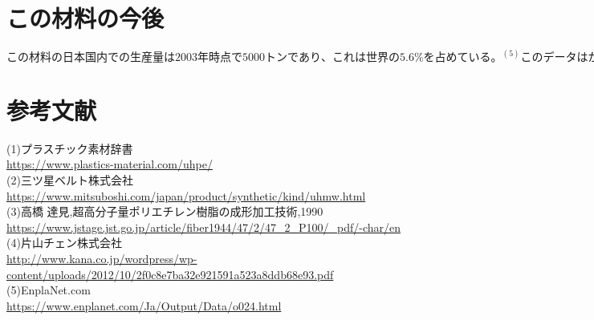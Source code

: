 \documentclass[dvipdfmx,autodetect-engine,titlepage]{jsarticle}
\begin{document}
\section{この材料の今後}
\begin{math}
  この材料の日本国内での生産量は2003年時点で5000トンであり、これは世界の5.6\%
を占めている。^{(5)}このデータはかなり古いものであるが、現在ではさらに使用量が増えていると考えて
良いだろう。なぜなら、CiNii Articlesで超高分子ポリエチレンを調べたところ、
最近に出版された論文がいくつか見つけることができたからである、つまりこれは、
現代でも研究開発が行われているということである。近年のこの材料の使用方法
としては、人体に無毒であることを利用して、人工関節、医療機器、によく使用
されていることがわかった。さらに、今後はロボット分野でも使用されていくと
考えられる。
\end{math}

\section{参考文献}

(1)プラスチック素材辞書\\
\url{https://www.plastics-material.com/uhpe/}\\

(2)三ツ星ベルト株式会社\\
\url{https://www.mitsuboshi.com/japan/product/synthetic/kind/uhmw.html}\\

(3)高橋 達見,超高分子量ポリエチレン樹脂の成形加工技術,1990\\
\url{https://www.jstage.jst.go.jp/article/fiber1944/47/2/47_2_P100/_pdf/-char/en}\\

(4)片山チェン株式会社\\
\url{http://www.kana.co.jp/wordpress/wp-content/uploads/2012/10/2f0c8e7ba32e921591a523a8ddb68e93.pdf}\\

(5)EnplaNet.com\\
\url{https://www.enplanet.com/Ja/Output/Data/o024.html}
\end{document}
